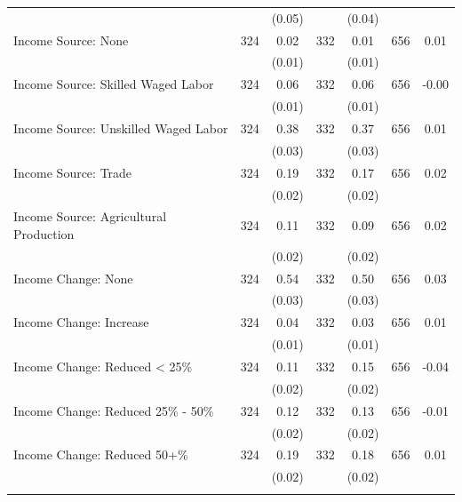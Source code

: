 \begin{tabular}{@{\extracolsep{5pt}}lcccccc}
 &   & (0.05)  &   & (0.04)  &   &  \\ [1ex]
Income Source: None   & 324    & 0.02    & 332    & 0.01    & 656    & 0.01   \\
 &   & (0.01)  &   & (0.01)  &   &  \\ [1ex]
Income Source: Skilled Waged Labor   & 324    & 0.06    & 332    & 0.06    & 656    & -0.00   \\
 &   & (0.01)  &   & (0.01)  &   &  \\ [1ex]
Income Source: Unskilled Waged Labor   & 324    & 0.38    & 332    & 0.37    & 656    & 0.01   \\
 &   & (0.03)  &   & (0.03)  &   &  \\ [1ex]
Income Source: Trade   & 324    & 0.19    & 332    & 0.17    & 656    & 0.02   \\
 &   & (0.02)  &   & (0.02)  &   &  \\ [1ex]
Income Source: Agricultural Production   & 324    & 0.11    & 332    & 0.09    & 656    & 0.02   \\
 &   & (0.02)  &   & (0.02)  &   &  \\ [1ex]
Income Change: None   & 324    & 0.54    & 332    & 0.50    & 656    & 0.03   \\
 &   & (0.03)  &   & (0.03)  &   &  \\ [1ex]
Income Change: Increase   & 324    & 0.04    & 332    & 0.03    & 656    & 0.01   \\
 &   & (0.01)  &   & (0.01)  &   &  \\ [1ex]
Income Change: Reduced < 25\%   & 324    & 0.11    & 332    & 0.15    & 656    & -0.04   \\
 &   & (0.02)  &   & (0.02)  &   &  \\ [1ex]
Income Change: Reduced 25\% - 50\%   & 324    & 0.12    & 332    & 0.13    & 656    & -0.01   \\
 &   & (0.02)  &   & (0.02)  &   &  \\ [1ex]
Income Change: Reduced 50+\%   & 324    & 0.19    & 332    & 0.18    & 656    & 0.01   \\
 &   & (0.02)  &   & (0.02)  &   &  \\ [1ex]
\hline \hline \\[-1.8ex]

\end{tabular}
